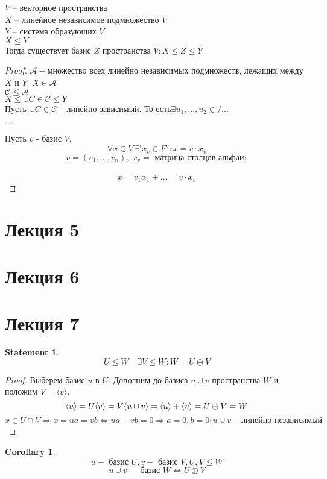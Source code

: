 \documentclass[11pt]{book}
\theoremstyle{definition}
\theoremstyle{plain}
\theoremstyle{plain}
\newtheorem*{st}{Statement}
\theoremstyle{definition}
\newtheorem*{cor}{Corollary}
\theoremstyle{remark}
\begin{document}
\begin{thm}
$V $ -- векторное пространства \\
$X$  -- линейное независимое подмножество $V$\\
$Y$ -- система образующих $V$\\
$X \le Y$\\
Тогда существует базис $Z$ пространства $V: X \le Z \le Y$
\end{thm}
\begin{proof}
$\mathcal A - $множество всех линейно независимых подмножеств, лежащих между $X$ и $Y$. $X \in \mathcal A$\\
$\mathcal C \le \mathcal A $\\
$X \le \cup {C \in \mathcal C} \le Y$\\
Пусть $\cup {C \in \mathcal C}$ --  линейно зависимый. То есть$ \exists u_1, ...,  u_2 \in /...$

$\ldots$

Пусть $v$ - базис $V$.\\
$$\forall x \in V \: \exists! x_v \in F^v : x = v \cdot x_v$$
$$v = (v_1, \ldots , v_n), \; x_v = \mbox{ матрица столцов альфа} и;$$\\
$$x = v_1 \alpha_1 + \ldots = v\cdot x_v$$
\end{proof}

\section{Лекция 5}
\section{Лекция 6}

\section{Лекция 7}
\begin{st}
   $$U \le W \quad \exists V \le W : W=U\oplus V$$ 
\end{st}
\begin{proof}
    Выберем базис $u$ в $U$. Дополним до базиса $u \cup v$ пространства $W$ и положим $V = \langle v \rangle$. $$\langle u \rangle = U \\ \langle v \rangle=V \\ \langle u \cup v \rangle = \langle u \rangle + \langle v \rangle = U \oplus V = W$$
    $$ x \in U \cap V \Rightarrow x = ua = vb \Leftrightarrow ua-vb = 0 \Rightarrow a = 0, b = 0 (u \cup v - \mbox{линейно независимый}$$
\end{proof}
\begin{cor}
    $$ u - \mbox{ базис } U, v - \mbox{ базис } V, U, V \le W$$
    $$u \cup v - \mbox{ базис } W \Leftrightarrow U \oplus V$$
\end{cor}
\end{document}
